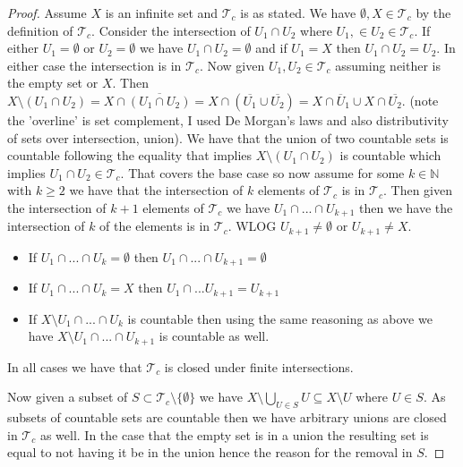 \documentclass{amsart}
\theoremstyle{plain}
\theoremstyle{definition}
\theoremstyle{remark}
\begin{document}
\begin{proof}
    Assume $X$ is an infinite set and $\mathcal T _ c$ is as stated. We have $\emptyset,X\in \mathcal T _c$ by the definition of $\mathcal T _c$. Consider the intersection of $U_1\cap U_2$ where $U_1,\in U_2 \in \mathcal T_c$. If either $U_1=\emptyset$ or $U_2=\emptyset$ we have $U_1\cap U_2=\emptyset$ and if $U_1=X$ then $U_1\cap U_2=U_2$. In either case the intersection is in $\mathcal T_c$. Now given $U_1,U_2\in \mathcal T_c$ assuming neither is the empty set or $X$. Then $X\setminus (U_1\cap U_2)=X\cap \overline{(U_1\cap U_2)}=X\cap(\overline{U_1}\cup \overline{U_2})=X\cap\overline U_1 \cup X\cap \overline {U_2}$. (note the 'overline' is set complement, I used De Morgan's laws and also distributivity of sets over intersection,  union). We have that the union of two countable sets is countable following the equality that implies $X\setminus (U_1\cap U_2)$ is countable which implies $U_1\cap U_2\in \mathcal T_c$. That covers the base case so now assume for some $k\in \mathbb{N}$ with $k\geq 2$ we have that the intersection of $k$ elements of $\mathcal T_c$ is in $\mathcal T_c$. Then given the intersection of $k+1$ elements of $\mathcal T_c$ we have $U_1\cap ... \cap U_{k+1}$ then we have the intersection of $k$ of the elements is in $\mathcal T_c$. WLOG $U_{k+1}\not =\emptyset$ or $U_{k+1}\not = X$.
    \begin{itemize}
        \item If $U_1\cap ...\cap U_k=\emptyset$ then $U_1\cap ...\cap U_{k+1}=\emptyset$
        \item If $U_1\cap ... \cap U_{k}=X$ then $U_1\cap ... U_{k+1}=U_{k+1}$
        \item If $X\setminus{U_1\cap ... \cap U_{k}}$ is countable then using the same reasoning as above we have $X\setminus{U_1\cap...\cap U_{k+1}}$ is countable as well.
    \end{itemize}
    In all cases we have that $\mathcal T_c$ is closed under finite intersections. 

    Now given a subset of $S\subset \mathcal T_c\setminus \{\emptyset\}$ we have $X\setminus \bigcup_{U\in S}U\subseteq X\setminus U$ where $U\in S$. As subsets of countable sets are countable then we have arbitrary unions are closed in $\mathcal {T}_c$ as well. In the case that the empty set is in a union the resulting set is equal to not having it be in the union hence the reason for the removal in $S$.


\end{proof}
\end{document}
